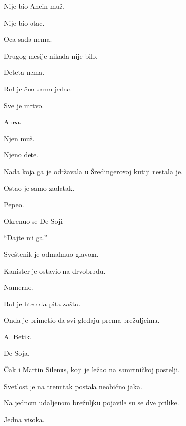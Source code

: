 Nije bio Anein muž.

Nije bio otac.

\bigskip

Oca sada nema.

\bigskip

Drugog mesije nikada nije bilo.

\bigskip

Deteta nema.

\bigskip

Rol je čuo samo jedno.

\bigskip

Sve je mrtvo.

\bigskip

Anea.

Njen muž.

Njeno dete.

\bigskip

Nada koja ga je održavala u Šredingerovoj kutiji nestala je.

\bigskip

Ostao je samo zadatak.

\bigskip

Pepeo.

\bigskip

Okrenuo se De Soji.

``Dajte mi ga.''

\bigskip

Sveštenik je odmahnuo glavom.

\bigskip

Kanister je ostavio na drvobrodu.

Namerno.

\bigskip

Rol je hteo da pita zašto.

\bigskip

Onda je primetio da svi gledaju prema brežuljcima.

\bigskip

A. Betik.

De Soja.

Čak i Martin Silenus, koji je ležao na samrtničkoj postelji.

\bigskip

Svetlost je na trenutak postala neobično jaka.

\bigskip

Na jednom udaljenom brežuljku pojavile su se dve prilike.

\bigskip

Jedna visoka.

